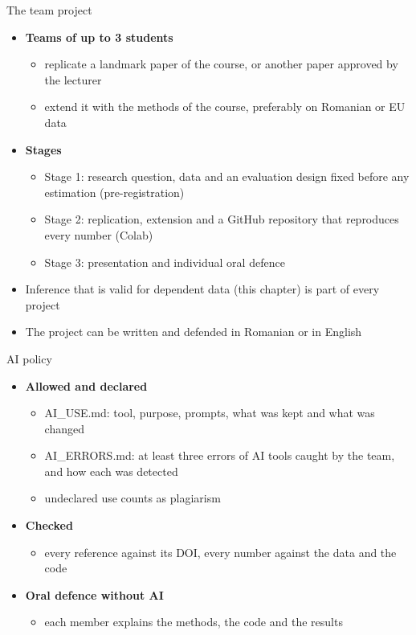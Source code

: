 \begin{frame}{The team project}
\itemsize{\footnotesize}
\begin{itemize}
    \item \textbf{Teams of up to 3 students}
    \begin{itemize}
        \item replicate a landmark paper of the course, or another paper approved by the lecturer
        \item extend it with the methods of the course, preferably on Romanian or EU data
    \end{itemize}
    \item \textbf{Stages}
    \begin{itemize}
        \item Stage 1: research question, data and an evaluation design fixed before any estimation (pre-registration)
        \item Stage 2: replication, extension and a GitHub repository that reproduces every number (Colab)
        \item Stage 3: presentation and individual oral defence
    \end{itemize}
    \item Inference that is valid for dependent data (this chapter) is part of every project
    \item The project can be written and defended in Romanian or in English
\end{itemize}
\end{frame}

\begin{frame}{AI policy}
\itemsize{\small}
\begin{itemize}
    \item \textbf{Allowed and declared}
    \begin{itemize}
        \item AI\_USE.md: tool, purpose, prompts, what was kept and what was changed
        \item AI\_ERRORS.md: at least three errors of AI tools caught by the team, and how each was detected
        \item undeclared use counts as plagiarism
    \end{itemize}
    \item \textbf{Checked}
    \begin{itemize}
        \item every reference against its DOI, every number against the data and the code
    \end{itemize}
    \item \textbf{Oral defence without AI}
    \begin{itemize}
        \item each member explains the methods, the code and the results
    \end{itemize}
\end{itemize}
\end{frame}

